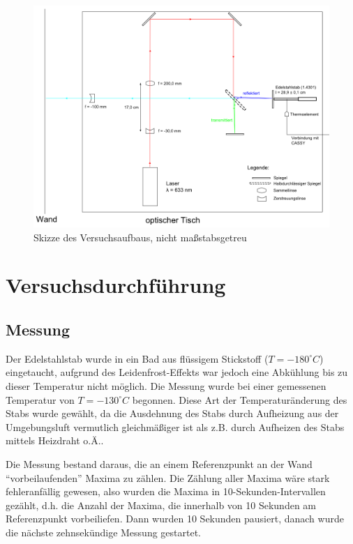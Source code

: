 \begin{landscape}
\begin{figure}
\includegraphics[height=\textwidth]{images/bitmap.png}
\caption{Skizze des Versuchsaufbaus, nicht maßstabsgetreu} 
\label{pic:skizze_versuchsaufbau}
\end{figure}
\end{landscape}

\section{Versuchsdurchführung}
\subsection{Messung}
Der Edelstahlstab wurde in ein Bad aus flüssigem Stickstoff ($T=-180^{\circ}C$) eingetaucht, aufgrund des Leidenfrost-Effekts war jedoch eine Abkühlung bis zu dieser Temperatur nicht möglich. Die Messung wurde bei einer gemessenen Temperatur von $T=-130^{\circ}C$ begonnen. Diese Art der Temperaturänderung des Stabs wurde gewählt, da die Ausdehnung des Stabs durch Aufheizung aus der Umgebungsluft vermutlich gleichmäßiger ist als z.B. durch Aufheizen des Stabs mittels Heizdraht o.Ä..

Die Messung bestand daraus, die an einem Referenzpunkt an der Wand \enquote{vorbeilaufenden} Maxima zu zählen. Die Zählung aller Maxima wäre stark fehleranfällig gewesen, also wurden die Maxima in 10-Sekunden-Intervallen gezählt, d.h. die Anzahl der Maxima, die innerhalb von 10 Sekunden am Referenzpunkt vorbeiliefen.  Dann wurden 10 Sekunden pausiert, danach wurde die nächste zehnsekündige Messung gestartet. 

